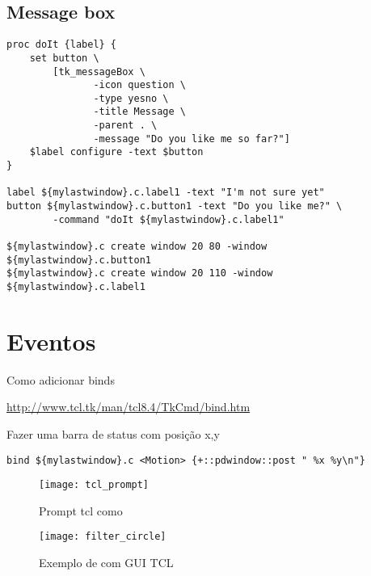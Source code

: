 \subsection{Message box}

\begin{lstlisting}
proc doIt {label} {
    set button \
        [tk_messageBox \
               -icon question \
               -type yesno \
               -title Message \
               -parent . \
               -message "Do you like me so far?"]
    $label configure -text $button
}

label ${mylastwindow}.c.label1 -text "I'm not sure yet"
button ${mylastwindow}.c.button1 -text "Do you like me?" \
        -command "doIt ${mylastwindow}.c.label1"

${mylastwindow}.c create window 20 80 -window ${mylastwindow}.c.button1
${mylastwindow}.c create window 20 110 -window ${mylastwindow}.c.label1
\end{lstlisting}

\section{Eventos}

Como adicionar binds

\url{http://www.tcl.tk/man/tcl8.4/TkCmd/bind.htm}

Fazer uma barra de status com posição x,y
\begin{lstlisting}
bind ${mylastwindow}.c <Motion> {+::pdwindow::post " %x %y\n"}
\end{lstlisting}

\begin{figure}[ht!]
	\centering
	\texttt{[image: tcl\_prompt]}
	\caption{Prompt tcl como \external}
\end{figure}

\begin{figure}[ht!]
	\centering
	\texttt{[image: filter\_circle]}
	\caption{Exemplo de \external com GUI TCL}
\end{figure}



